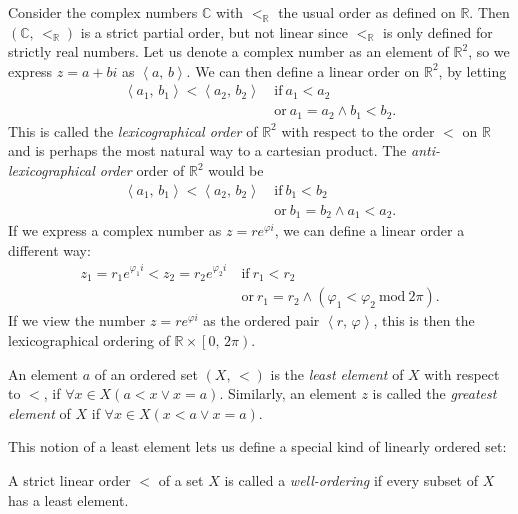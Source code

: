 \documentclass[../../main.tex]{subfiles}
\begin{document}
\begin{example}
    Consider the complex numbers $\mathbb{C}$ with $<_{\mathbb{R}}$ the usual order as defined on $\mathbb{R}$.
    Then $(\mathbb{C},\, <_{\mathbb{R}})$ is a strict partial order, but not linear since $<_{\mathbb{R}}$ is only defined for strictly real numbers.
    Let us denote a complex number as an element of $\mathbb{R}^2$, so we express $z = a + b i$ as $\left<a,\, b\right>$.
    We can then define a linear order on $\mathbb{R}^2$, by letting 
    \begin{align*}
        \left<a_1,\, b_1\right> < \left<a_2,\, b_2\right>\ &\text{if}\ a_1 < a_2 \\
        &\text{or}\ a_1 = a_2 \wedge b_1 < b_2.
    \end{align*}
    This is called the \textit{lexicographical order} of $\mathbb{R}^2$ with respect to the order $<$ on $\mathbb{R}$ and is perhaps the most natural way to a cartesian product. \cite[p.182]{Gol17}
    The \textit{anti-lexicographical order} order of $\mathbb{R}^2$ would be 
    \begin{align*}
        \left<a_1,\, b_1\right> < \left<a_2,\, b_2\right>\ &\text{if}\ b_1 < b_2 \\
        &\text{or}\ b_1 = b_2 \wedge a_1 < a_2.
    \end{align*}
    If we express a complex number as $z = r e^{\varphi i}$, we can define a linear order a different way:
    \begin{align*}
        z_1 = r_1 e^{\varphi_1 i} < z_2 = r_2 e^{\varphi_2 i}\ &\text{if}\ r_1 < r_2 \\
        &\text{or}\ r_1 = r_2 \wedge (\varphi_1 < \varphi_2\ \text{mod}\ 2\pi).
    \end{align*}
    If we view the number $z = r e^{\varphi i}$ as the ordered pair $\left<r,\, \varphi\right>$, this is then the lexicographical ordering of $\mathbb{R} \times \left[0,\, 2 \pi\right)$.
\end{example}

\begin{definition}\cite[p.12]{Jec78}
    An element $a$ of an ordered set $\left(X,\, <\right)$ is the \textit{least element} of $X$ with respect to $<$, if $\forall x \in X  \left(a < x \vee x = a\right)$.
    Similarly, an element $z$ is called the \textit{greatest element} of $X$ if $\forall x \in X  \left(x < a \vee x = a\right)$.
\end{definition}

This notion of a least element lets us define a special kind of linearly ordered set:
\begin{definition}\cite[p.13]{Jec78}
    A strict linear order $<$ of a set $X$ is called a \textit{well-ordering} if every subset of $X$ has a least element.
\end{definition}
\end{document}
